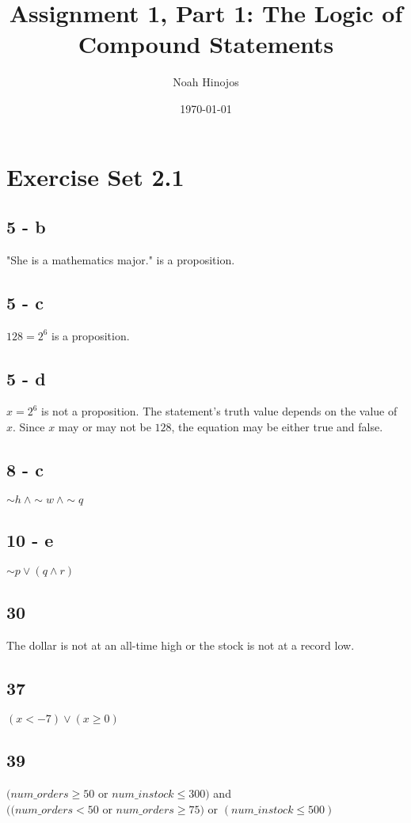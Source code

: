 \documentclass[12pt]{article}
\title{\textbf{Assignment 1, Part 1: The Logic of Compound Statements}}
\author{Noah Hinojos}
\date{\today}
\begin{document}
\maketitle

\section*{Exercise Set 2.1}

\subsection*{5 - b}
"She is a mathematics major." is a proposition.

\subsection*{5 - c}
$128 = 2^6$ is a proposition.

\subsection*{5 - d}
$x = 2^6$ is not a proposition. The statement's truth value depends on the value of $x$. Since $x$ may or may not be $128$, the equation may be either true and false.

\subsection*{8 - c}
$ \sim h \ \wedge \sim w \ \wedge \sim q$

\subsection*{10 - e}
$ \sim p \vee (q \wedge r)$

\subsection*{30}
The dollar is not at an all-time high or the stock is not at a record low.

\subsection*{37}
$(x < -7)\vee(x \geq 0)$

\subsection*{39}
$(num\_orders \geq 50$ or $num\_instock \leq 300)$ and 
\\ $((num\_orders < 50$ or $num\_orders \geq 75)$ or $(num\_instock \leq 500)$
\end{document}
